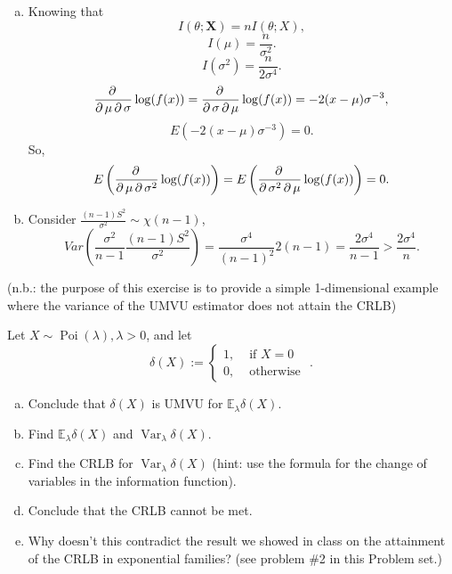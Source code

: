 \begin{solution}
    \begin{enumerate}[(a)]
        \item Knowing that 
        \[
            I(\theta;\mathbf{X})=nI(\theta;X), 
        \]
        \[
            I(\mu)=\frac{n}{\sigma^2}. 
        \]
        \[
            I(\sigma^2)=\frac{n}{2\sigma^4}. 
        \]
        \[
            \frac{\partial\,}{\partial\, \mu \,\partial\, \sigma}\log(f(x))=\frac{\partial\,}{\partial\, \sigma \,\partial\, \mu}\log(f(x))=-2(x-\mu)\sigma^{-3}, 
        \]
        \[
            E\left(-2(x-\mu)\sigma^{-3}\right)=0. 
        \]
        So, 
        \[
            E\left(\frac{\partial\,}{\partial\, \mu \,\partial\, \sigma^2}\log(f(x))\right)=E\left(\frac{\partial\,}{\partial\, \sigma^2 \,\partial\, \mu}\log(f(x))\right)=0.
        \]
        \item Consider $\frac{(n-1)S^2}{\sigma^2}\sim \chi(n-1)$, 
        \[
            Var\left(\frac{\sigma^2}{n-1}\frac{(n-1)S^2}{\sigma^2}\right)=\frac{\sigma^4}{(n-1)^2}2(n-1)=\frac{2\sigma^4}{n-1}>\frac{2\sigma^4}{n}. 
        \]
    \end{enumerate}
\end{solution}

\begin{ex}
    (n.b.: the purpose of this exercise is to provide a simple 1-dimensional example where the variance of the UMVU estimator does not attain the CRLB) 
    
    Let \(X \sim \operatorname{Poi}(\lambda), \lambda>0\), and let
    \[
        \delta(X):= \begin{cases}1, & \text { if } X=0 \\ 0, & \text { otherwise }\end{cases}. 
    \]
    \begin{enumerate}[(a)]
        \item Conclude that \(\delta(X)\) is UMVU for \(\mathbb{E}_{\lambda} \delta(X)\). 
        \item Find \(\mathbb{E}_{\lambda} \delta(X)\) and \(\operatorname{Var}_{\lambda} \delta(X)\). 
        \item Find the CRLB for \(\operatorname{Var}_{\lambda} \delta(X)\) (hint: use the formula for the change of variables in the information function). 
        \item Conclude that the CRLB cannot be met. 
        \item Why doesn't this contradict the result we showed in class on the attainment of the CRLB in exponential families? (see problem \#2 in this Problem set.)
    \end{enumerate}
\end{ex}


